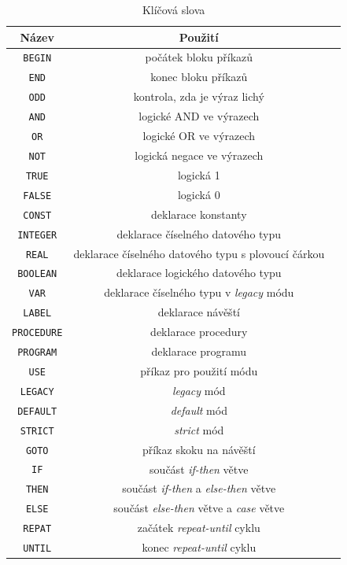 \documentclass[
12pt,
a4paper,
pdftex,
czech,
titlepage
]{report}
\begin{document}
\begin{longtable}{|c|c|p{8cm}|}
\caption{Klíčová slova}
\label{slova}
\endfirsthead
\endhead
\hline
		\textbf{Název} &\textbf{Použití} \\
\hline
\texttt{BEGIN} & počátek bloku příkazů \\ \hline
\texttt{END} & konec bloku příkazů \\ \hline
\texttt{ODD} & kontrola, zda je výraz lichý \\ \hline
\texttt{AND} & logické AND ve výrazech \\ \hline
\texttt{OR} & logické OR ve výrazech \\ \hline
\texttt{NOT} & logická negace ve výrazech \\ \hline
\texttt{TRUE} & logická 1 \\ \hline
\texttt{FALSE} & logická 0 \\ \hline
\texttt{CONST} & deklarace konstanty \\ \hline
\texttt{INTEGER} & deklarace číselného datového typu \\ \hline
\texttt{REAL} & deklarace číselného datového typu s plovoucí čárkou \\ \hline
\texttt{BOOLEAN} & deklarace logického datového typu \\ \hline
\texttt{VAR} & deklarace číselného typu v \textit{legacy} módu \\ \hline
\texttt{LABEL} & deklarace návěští \\ \hline
\texttt{PROCEDURE} & deklarace procedury \\ \hline
\texttt{PROGRAM} & deklarace programu \\ \hline
\texttt{USE} & příkaz pro použití módu \\ \hline
\texttt{LEGACY} & \textit{legacy} mód \\ \hline
\texttt{DEFAULT} & \textit{default} mód \\ \hline
\texttt{STRICT} & \textit{strict} mód \\ \hline
\texttt{GOTO} & příkaz skoku na návěští \\ \hline
\texttt{IF} & součást \textit{if-then} větve \\ \hline
\texttt{THEN} & součást \textit{if-then} a \textit{else-then} větve \\ \hline
\texttt{ELSE} & součást \textit{else-then} větve a \textit{case} větve \\ \hline
\texttt{REPAT} & začátek \textit{repeat-until} cyklu \\ \hline
\texttt{UNTIL} & konec \textit{repeat-until} cyklu \\ \hline

\end{longtable}
\end{document}
